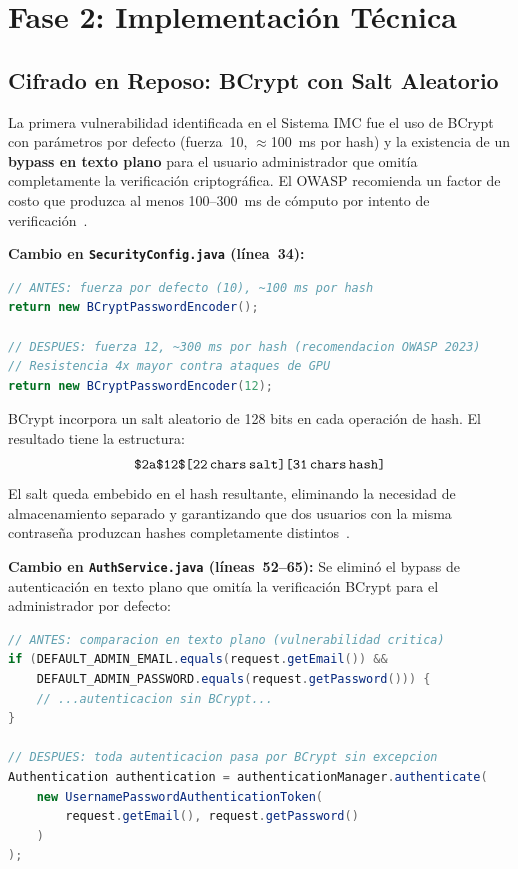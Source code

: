 \section*{Fase 2: Implementación Técnica}

\subsection*{Cifrado en Reposo: BCrypt con Salt Aleatorio}

La primera vulnerabilidad identificada en el Sistema IMC fue el uso de BCrypt con parámetros por
defecto (fuerza~10, $\approx$100~ms por hash) y la existencia de un \textbf{bypass en texto
plano} para el usuario administrador que omitía completamente la verificación criptográfica. El
OWASP recomienda un factor de costo que produzca al menos 100--300~ms de cómputo por intento de
verificación~\cite{owasp2023}.

\textbf{Cambio en \texttt{SecurityConfig.java} (línea~34):}

\begin{lstlisting}[language=Java, caption={Incremento de la fortaleza de BCrypt de 10 a 12}]
// ANTES: fuerza por defecto (10), ~100 ms por hash
return new BCryptPasswordEncoder();

// DESPUES: fuerza 12, ~300 ms por hash (recomendacion OWASP 2023)
// Resistencia 4x mayor contra ataques de GPU
return new BCryptPasswordEncoder(12);
\end{lstlisting}

BCrypt incorpora un salt aleatorio de 128 bits en cada operación de hash. El resultado tiene
la estructura:
\[
    \texttt{\$2a\$12\$[22\,chars\,salt][31\,chars\,hash]}
\]
El salt queda embebido en el hash resultante, eliminando la necesidad de almacenamiento separado
y garantizando que dos usuarios con la misma contraseña produzcan hashes completamente
distintos~\cite{owasp2023}.

\textbf{Cambio en \texttt{AuthService.java} (líneas~52--65):} Se eliminó el bypass de
autenticación en texto plano que omitía la verificación BCrypt para el administrador por defecto:

\begin{lstlisting}[language=Java, caption={Eliminación del bypass de autenticación en texto plano}]
// ANTES: comparacion en texto plano (vulnerabilidad critica)
if (DEFAULT_ADMIN_EMAIL.equals(request.getEmail()) &&
    DEFAULT_ADMIN_PASSWORD.equals(request.getPassword())) {
    // ...autenticacion sin BCrypt...
}

// DESPUES: toda autenticacion pasa por BCrypt sin excepcion
Authentication authentication = authenticationManager.authenticate(
    new UsernamePasswordAuthenticationToken(
        request.getEmail(), request.getPassword()
    )
);
\end{lstlisting}


